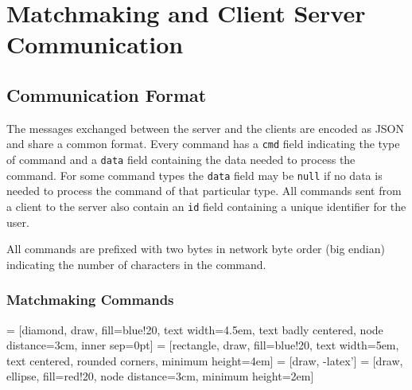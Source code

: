 \section{Matchmaking and Client Server Communication}

\subsection{Communication Format}
The messages exchanged between the server and the clients are encoded as JSON and share a common format.
Every command has a \texttt{cmd} field indicating the type of command and a \texttt{data} field containing the data needed to process the command.
For some command types the \texttt{data} field may be \texttt{null} if no data is needed to process the command of that particular type.
All commands sent from a client to the server also contain an \texttt{id} field containing a unique identifier for the user.

All commands are prefixed with two bytes in network byte order (big endian) indicating the number of characters in the command.


\subsubsection{Matchmaking Commands}


 = [diamond, draw, fill=blue!20, text width=4.5em, text badly centered, node distance=3cm, inner sep=0pt]
 = [rectangle, draw, fill=blue!20, text width=5em, text centered, rounded corners, minimum height=4em]
 = [draw, -latex']
 = [draw, ellipse, fill=red!20, node distance=3cm, minimum height=2em]

\begin{center}
\end{center}

